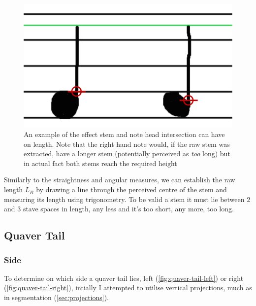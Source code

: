 \begin{figure}[h!]
    \centering
    \includegraphics[width=.8\textwidth]{gfx/techniques/stem-intersection-labelled.png}
    \caption{An example of the effect stem and note head intersection can have on length. Note that the right hand note would, if the raw stem was extracted, have a longer stem (potentially perceived as \emph{too} long) but in actual fact both stems reach the required height}
    \label{fig:stem-intersection}
\end{figure}

Similarly to the straightness and angular measures, we can establish the raw length $L_R$ by drawing a line through the perceived centre of the stem and measuring its length using trigonometry. To be valid a stem it must lie between 2 and 3 stave spaces in length, any less and it's too short, any more, too long.

\subsection{Quaver Tail}

\subsubsection{Side}\label{sec:scoring-quaver-tail-side}


To determine on which side a quaver tail lies, left (\cref{fig:quaver-tail-left}) or right (\cref{fig:quaver-tail-right}), intially I attempted to utilise vertical projections, much as in segmentation (\cref{sec:projections}).

